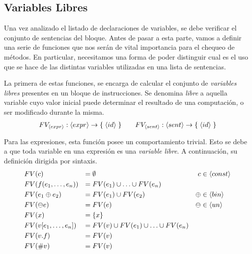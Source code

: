 \documentclass{article}
\begin{document}
\begin{prooftree}
\end{prooftree}

\begin{prooftree}
\end{prooftree}

\subsection{Variables Libres}

Una vez analizado el listado de declaraciones de variables, se debe verificar el conjunto de sentencias del bloque.
Antes de pasar a esta parte, vamos a definir una serie de funciones que nos serán de vital importancia para el chequeo de métodos.
En particular, necesitamos una forma de poder distinguir cual es el uso que se hace de las distintas variables utilizadas en una lista de sentencias.

La primera de estas funciones, se encarga de calcular el conjunto de \textit{variables libres} presentes en un bloque de instrucciones.
Se denomina \textit{libre} a aquella variable cuyo valor inicial puede determinar el resultado de una computación, o ser modificado durante la misma.
\begin{gather*}
FV_{\NT{expr}}: \NT{expr} \RA \{ \; \NT{id} \; \}
\qquad
FV_{\NT{sent}}: \NT{sent} \RA \{ \; \NT{id} \; \}
\end{gather*}

Para las expresiones, esta función posee un comportamiento trivial.
Esto se debe a que toda variable en una expresión es una \textit{variable libre}.
A continuación, su definición dirigida por sintaxis.
\begin{align*}
&\FV{c}
&=&\;
\emptyset
&c &\in \NT{const}
\\
&\FV{f(e_1, \ldots, e_n)}
&=&\;
\FV{e_1} \cup \ldots \cup \FV{e_n}
\\
&\FV{e_1 \oplus e_2}
&=&\;
\FV{e_1} \cup \FV{e_2}
&\oplus &\in \NT{bin}
\\
&\FV{\ominus e}
&=&\;
\FV{e}
&\ominus &\in \NT{un}
\\
&\FV{x}
&=&\;
\{ x \}
\\
&\FV{v [e_1, \ldots, e_n]}
&=&\;
\FV{v} \cup \FV{e_1} \cup \ldots \cup \FV{e_n}
\\
&\FV{v.f}
&=&\;
\FV{v}
\\
&\FV{\# v}
&=&\;
\FV{v}
\end{align*}
\end{document}
